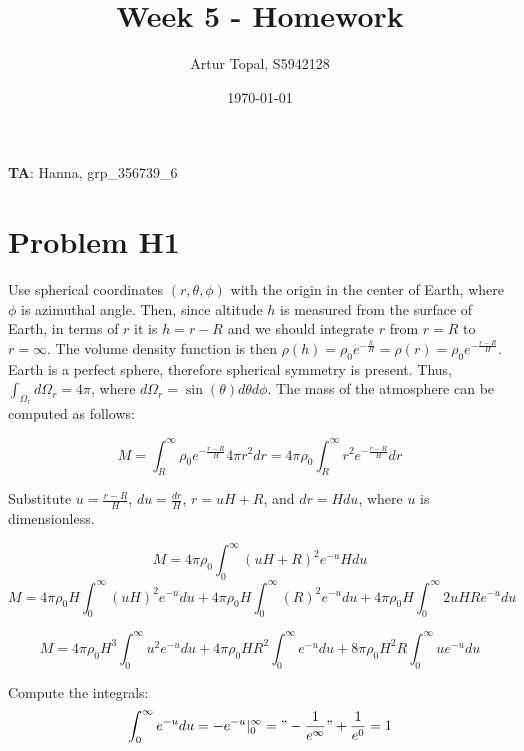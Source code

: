 \documentclass{article}
\title{Week 5 - Homework}
\author{Artur Topal, S5942128}
\date{\today}
\begin{document}
\maketitle

\begin{center}
  \textbf{TA}: Hanna, grp\_356739\_6
\end{center}

\pagebreak
\section{ Problem H1 } 

Use spherical coordinates $(r, \theta, \phi)$ with the origin in the center of Earth, where $\phi$ is azimuthal angle. Then, since altitude $h$ is measured from the surface of Earth, in terms of $r$ it is $h=r-R$ and we should integrate $r$ from $r=R$ to $r=\infty$. The volume density function is then $\rho(h) = \rho_0 e^{-\frac{h}{H}} = \rho(r) = \rho_0 e^{-\frac{r-R}{H}}$. Earth is a perfect sphere, therefore spherical symmetry is present. Thus, $\int_{\Omega_r} d\Omega_r = 4\pi$, where $d\Omega_r = \sin(\theta) d\theta d\phi$. The mass of the atmosphere can be computed as follows:

\begin{equation*}
M = \int_{R}^{\infty} \rho_0 e^{-\frac{r-R}{H}} 4\pi r^2 dr = 4\pi \rho_0 \int_{R}^{\infty} r^2 e^{-\frac{r-R}{H}} dr
\end{equation*}

Substitute $u = \frac{r- R}{H}$, $du = \frac{dr}{H}$, $r = uH + R$, and $dr = Hdu$, where $u$ is dimensionless.

\begin{equation*}
M = 4\pi \rho_0 \int_{0}^{\infty} (uH + R)^2 e^{-u} Hdu
\end{equation*}
\begin{equation*}
M = 4\pi \rho_0H \int_{0}^{\infty} (uH)^2 e^{-u} du + 4\pi \rho_0H \int_{0}^{\infty} (R)^2 e^{-u} du + 4\pi \rho_0H \int_{0}^{\infty} 2uHR e^{-u} du
\end{equation*}

\begin{equation} \label{eq:mass_uneval}
M = 4\pi \rho_0H^3 \int_{0}^{\infty} u^2 e^{-u} du + 4\pi \rho_0HR^2 \int_{0}^{\infty} e^{-u} du + 8\pi \rho_0H^2R \int_{0}^{\infty} u e^{-u} du
\end{equation}

Compute the integrals: 
\begin{equation*}
  \int_0^\infty e^{-u} du = -e^{-u} |_0^\infty = "-\frac{1}{e^\infty}" + \frac{1}{e^0} = 1
\end{equation*}
\end{document}

